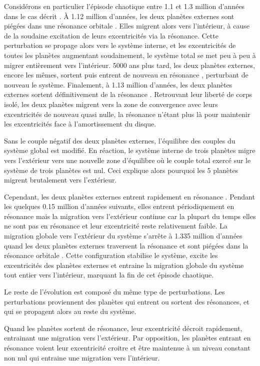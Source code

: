 Considérons en particulier l'épisode chaotique entre 1.1 et 1.3 million d'années dans le cas décrit . À 1.12 million d'années, les deux planètes externes sont piégées dans une résonance orbitale . Elles migrent alors vers l'intérieur, à cause de la soudaine excitation de leurs excentricités via la résonance. Cette perturbation se propage alors vers le système interne, et les excentricités de toutes les planètes augmentant soudainement, le système total se met peu à peu à migrer entièrement vers l'intérieur. 5000 ans plus tard, les deux planètes externes, encore les mêmes, sortent puis entrent de nouveau en résonance , perturbant de nouveau le système. Finalement, à 1.13 million d'années, les deux planètes externes sortent définitivement de la résonance . Retrouvant leur liberté de corps isolé, les deux planètes migrent vers la zone de convergence avec leurs excentricités de nouveau quasi nulle, la résonance n'étant plus là pour maintenir les 
excentricités face à l'amortissement du disque.

Sans le couple négatif des deux planètes externes, l'équilibre des couples du système global est modifié. En réaction, le système interne de trois planètes migre vers l'extérieur vers une nouvelle zone d'équilibre où le couple total exercé sur le système de trois planètes est nul. Ceci explique alors pourquoi les 5 planètes migrent brutalement vers l'extérieur. 

Cependant, les deux planètes externes entrent rapidement en résonance . Pendant les quelques 0.15 million d'années suivants, elles entrent périodiquement en résonance  mais la migration vers l'extérieur continue car la plupart du temps elles ne sont pas en résonance et leur excentricité reste relativement faible. La migration globale vers l'extérieur du système s'arrête à 1.335 million d'années quand les deux planètes externes traversent la résonance  et sont piégées dans la résonance orbitale . Cette configuration stabilise le système, excite les excentricités des planètes externes et entraine la migration globale du système tout entier vers l'intérieur, marquant la fin de cet épisode chaotique. 

\bigskip

Le reste de l'évolution est composé du même type de perturbations. Les perturbations proviennent des planètes qui entrent ou sortent des résonances, et qui se propagent alors au reste du système. 

Quand les planètes sortent de résonance, leur excentricité décroit rapidement, entrainant une migration vers l'extérieur. Par opposition, les planètes entrant en résonance voient leur excentricité croitre et être maintenue à un niveau constant non nul qui entraine une migration vers l'intérieur. 

